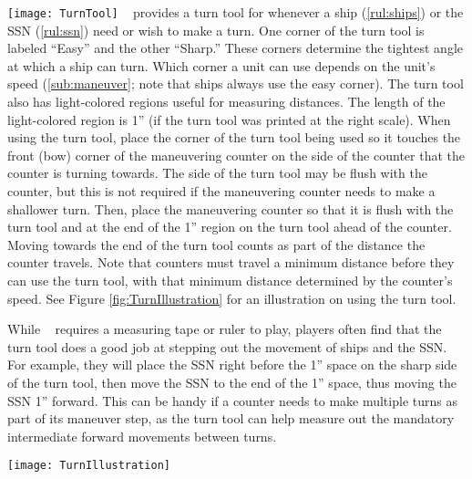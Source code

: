 \documentclass[../TacSubMicroRules.tex]{subfiles}
\begin{document}
\texttt{[image: TurnTool]}
\gametitle~ provides a turn tool for whenever a ship (\ref{rul:ships}) or the SSN (\ref{rul:ssn}) need or wish to make a turn.
One corner of the turn tool is labeled ``Easy'' and the other ``Sharp.''
These corners determine the tightest angle at which a ship can turn.
Which corner a unit can use depends on the unit's speed (\ref{sub:maneuver}; note that ships always use the easy corner).
The turn tool also has light-colored regions useful for measuring distances.
The length of the light-colored region is 1'' (if the turn tool was printed at the right scale).
When using the turn tool, place the corner of the turn tool being used so it touches the front (bow) corner of the maneuvering counter on the side of the counter that the counter is turning towards.
The side of the turn tool may be flush with the counter, but this is not required if the maneuvering counter needs to make a shallower turn.
Then, place the maneuvering counter so that it is flush with the turn tool and at the end of the 1'' region on the turn tool ahead of the counter.
Moving towards the end of the turn tool counts as part of the distance the counter travels.
Note that counters must travel a minimum distance before they can use the turn tool, with that minimum distance determined by the counter's speed.
See Figure \ref{fig:TurnIllustration} for an illustration on using the turn tool.

\begin{design}
    While \gametitle~ requires a measuring tape or ruler to play, players often find that the turn tool does a good job at stepping out the movement of ships and the SSN.
    For example, they will place the SSN right before the 1'' space on the sharp side of the turn tool, then move the SSN to the end of the 1'' space, thus moving the SSN 1'' forward.
    This can be handy if a counter needs to make multiple turns as part of its maneuver step, as the turn tool can help measure out the mandatory intermediate forward movements between turns.
\end{design}

\begin{Figure}
    \centering
    \texttt{[image: TurnIllustration]}
    \label{fig:TurnIllustration}
\end{Figure}
\end{document}
